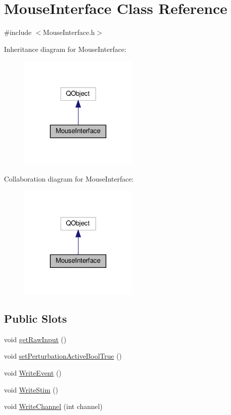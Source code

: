 \hypertarget{class_mouse_interface}{}\section{Mouse\+Interface Class Reference}
\label{class_mouse_interface}


{\ttfamily \#include $<$Mouse\+Interface.\+h$>$}



Inheritance diagram for Mouse\+Interface\+:
\nopagebreak
\begin{figure}[H]
\begin{center}
\leavevmode
\includegraphics[width=164pt]{class_mouse_interface__inherit__graph}
\end{center}
\end{figure}


Collaboration diagram for Mouse\+Interface\+:
\nopagebreak
\begin{figure}[H]
\begin{center}
\leavevmode
\includegraphics[width=164pt]{class_mouse_interface__coll__graph}
\end{center}
\end{figure}
\subsection*{Public Slots}
\begin{DoxyCompactItemize}
\item 
void \hyperlink{class_mouse_interface_ac1ad8eb6785b8a18c368faa8610494a7}{get\+Raw\+Input} ()
\item 
void \hyperlink{class_mouse_interface_a0d37a6e4edbdec54ddabf1e71afae796}{set\+Perturbation\+Active\+Bool\+True} ()
\item 
void \hyperlink{class_mouse_interface_aa70911c968ecc9ac8b6ce7de752d3689}{Write\+Event} ()
\item 
void \hyperlink{class_mouse_interface_a292f829bcd243f2b462b20b83b5dc273}{Write\+Stim} ()
\item 
void \hyperlink{class_mouse_interface_a82af3fc9748aa565809317e6395f0696}{Write\+Channel} (int channel)
\end{DoxyCompactItemize}

